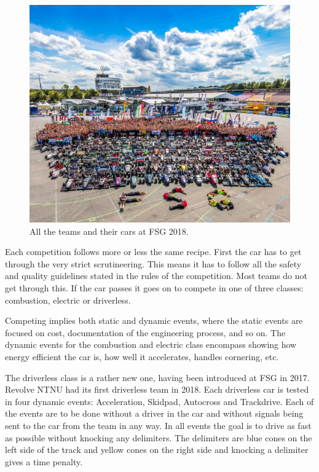 \begin{figure}
    \centering
    \includegraphics[width=\linewidth]{0_Images/2_Introduction/FSG18.jpg}
    \caption[All the teams and their cars at FSG 2018.]{All the teams and their cars at FSG 2018.}
    \label{Fig:FSG18}
\end{figure}

Each competition follows more or less the same recipe. First the car has to get through the very strict scrutineering. This means it has to follow all the safety and quality guidelines stated in the rules of the competition. Most teams do not get through this. If the car passes it goes on to compete in one of three classes: combustion, electric or driverless. 

Competing implies both static and dynamic events, where the static events are focused on cost, documentation of the engineering process, and so on. The dynamic events for the combustion and electric class encompass showing how energy efficient the car is, how well it accelerates, handles cornering, etc. 

The driverless class is a rather new one, having been introduced at \gls{FSG} in 2017. Revolve NTNU had its first driverless team in 2018. Each driverless car is tested in four dynamic events: Acceleration, Skidpad, Autocross and Trackdrive. Each of the events are to be done without a driver in the car and without signals being sent to the car from the team in any way. In all events the goal is to drive as fast as possible without knocking any delimiters. The delimiters are blue cones on the left side of the track and yellow cones on the right side and knocking a delimiter gives a time penalty.

